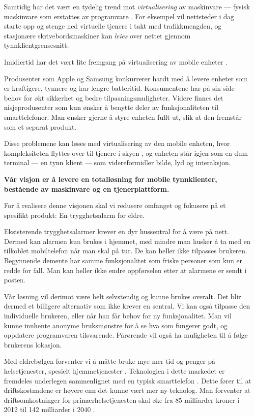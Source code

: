 Samtidig har det vært en tydelig trend mot \textit{virtualisering} av
maskinvare --- fysisk maskinvare som erstattes av programvare
\cite{2006.virtualization.trends}.  For eksempel vil nettsteder i dag starte
opp og stenge ned virtuelle tjenere i takt med trafikkmengden, og stasjonære
skrivebordsmaskiner kan \textit{leies} over nettet gjennom
tynnklientgrensesnitt.

Imidlertid har det vært lite fremgang på virtualisering av mobile enheter
\cite{embedded.virtualization}.

Produsenter som Apple og Samsung konkurrerer hardt med å levere enheter som er
kraftigere, tynnere og har lengre batteritid.
%
Konsumentene har på sin side behov for økt sikkerhet og bedre
tilpasningsmuligheter.
%
Videre finnes det nisjeprodusenter som kun ønsker å benytte deler av
funksjonaliteten til smarttelefoner.
%
Man ønsker gjerne å styre enheten fullt ut, slik at den fremstår som et separat
produkt.

Disse problemene kan løses med virtualisering av den mobile enheten, hvor
kompleksiteten flyttes over til tjenere i skyen \cite{mobil.virt.fordel}, og
enheten står igjen som en dum terminal --- en tynn klient --- som
videreformidler bilde, lyd og interaksjon.

\textbf{Vår visjon er å levere en totalløsning for mobile tynnklienter,
bestående av maskinvare og en tjenerplattform.}

For å realisere denne visjonen skal vi redusere omfanget og fokusere på et
spesifikt produkt: En trygghetsalarm for eldre.

Eksisterende trygghetsalarmer krever en dyr hussentral for å være på nett.
Dermed kan alarmen kun brukes i hjemmet, med mindre man husker å ta med en
tilkoblet mobiltelefon når man skal på tur. De kan heller ikke tilpasses
brukeren. Begynnende demente har samme funksjonalitet som friske personer som
kun er redde for fall. Man kan heller ikke endre oppførselen etter at alarmene
er sendt i posten.

Vår løsning vil derimot være helt selvstendig og kunne brukes overalt. Det blir
dermed et billigere alternativ som ikke krever en sentral. Vi kan også tilpasse
den individuelle brukeren, eller når han får behov for ny funksjonalitet. Man
vil kunne innhente anonyme bruksmønstre for å se hva som fungerer godt, og
oppdatere programvaren tilsvarende. Pårørende vil også ha muligheten til å
følge brukerens lokasjon.

Med eldrebølgen forventer vi å måtte bruke mye mer tid og penger på
helsetjenester, spesielt hjemmetjenester \cite{lfh.innspill}. Teknologien i
dette markedet er fremdeles underlegen sammenlignet med en typisk smarttelefon
\cite{alarmparadokset}. Dette fører til at driftskostnadene er høyere enn det
kunne vært mer ny teknolog. Man forventer at driftsomkostninger for
primærhelsetjenesten skal øke fra 85 milliarder kroner i 2012 til 142
milliarder i 2040 \cite{lfh.innspill}.

